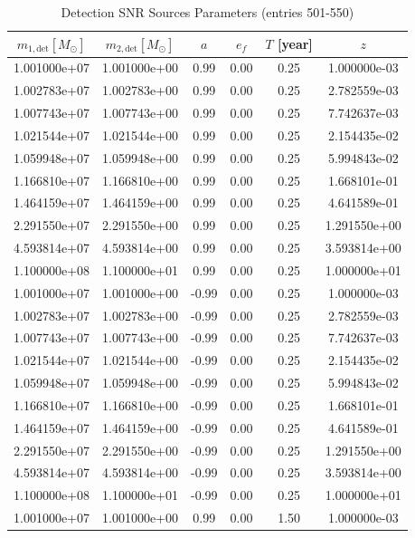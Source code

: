 \documentclass{article}
\begin{document}
\clearpage

\begin{table}[htbp]
\centering
\caption{Detection SNR Sources Parameters (entries 501-550)}
\label{tab:snr_sources_11}
\begin{tabular}{cccccc}
\hline
$m_{1,\mathrm{det}} [M_\odot]$ & $m_{2,\mathrm{det}} [M_\odot]$ & $a$ & $e_f$ & $T$ [year] & $z$ \\
\hline
1.001000e+07 & 1.001000e+00 & 0.99 & 0.00 & 0.25 & 1.000000e-03 \\
1.002783e+07 & 1.002783e+00 & 0.99 & 0.00 & 0.25 & 2.782559e-03 \\
1.007743e+07 & 1.007743e+00 & 0.99 & 0.00 & 0.25 & 7.742637e-03 \\
1.021544e+07 & 1.021544e+00 & 0.99 & 0.00 & 0.25 & 2.154435e-02 \\
1.059948e+07 & 1.059948e+00 & 0.99 & 0.00 & 0.25 & 5.994843e-02 \\
1.166810e+07 & 1.166810e+00 & 0.99 & 0.00 & 0.25 & 1.668101e-01 \\
1.464159e+07 & 1.464159e+00 & 0.99 & 0.00 & 0.25 & 4.641589e-01 \\
2.291550e+07 & 2.291550e+00 & 0.99 & 0.00 & 0.25 & 1.291550e+00 \\
4.593814e+07 & 4.593814e+00 & 0.99 & 0.00 & 0.25 & 3.593814e+00 \\
1.100000e+08 & 1.100000e+01 & 0.99 & 0.00 & 0.25 & 1.000000e+01 \\
1.001000e+07 & 1.001000e+00 & -0.99 & 0.00 & 0.25 & 1.000000e-03 \\
1.002783e+07 & 1.002783e+00 & -0.99 & 0.00 & 0.25 & 2.782559e-03 \\
1.007743e+07 & 1.007743e+00 & -0.99 & 0.00 & 0.25 & 7.742637e-03 \\
1.021544e+07 & 1.021544e+00 & -0.99 & 0.00 & 0.25 & 2.154435e-02 \\
1.059948e+07 & 1.059948e+00 & -0.99 & 0.00 & 0.25 & 5.994843e-02 \\
1.166810e+07 & 1.166810e+00 & -0.99 & 0.00 & 0.25 & 1.668101e-01 \\
1.464159e+07 & 1.464159e+00 & -0.99 & 0.00 & 0.25 & 4.641589e-01 \\
2.291550e+07 & 2.291550e+00 & -0.99 & 0.00 & 0.25 & 1.291550e+00 \\
4.593814e+07 & 4.593814e+00 & -0.99 & 0.00 & 0.25 & 3.593814e+00 \\
1.100000e+08 & 1.100000e+01 & -0.99 & 0.00 & 0.25 & 1.000000e+01 \\
1.001000e+07 & 1.001000e+00 & 0.99 & 0.00 & 1.50 & 1.000000e-03 \\

\end{tabular}
\end{table}
\end{document}
